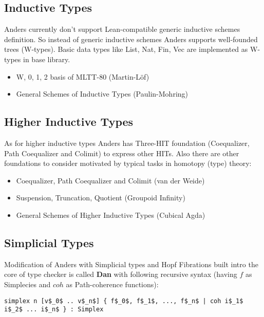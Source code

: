 \documentclass{article}
\theoremstyle{definition}
\begin{document}
\newpage
\subsection{Inductive Types}

Anders currently don’t support Lean-compatible generic inductive schemes
definition. So instead of generic inductive schemes Anders supports well-founded trees (W-types).
Basic data types like List, Nat, Fin, Vec are implemented as W-types in base library.

\begin{itemize}
\item W, 0, 1, 2 basis of MLTT-80 (Martin-L\"{o}f)
\item General Schemes of Inductive Types (Paulin-Mohring)
\end{itemize}

\subsection{Higher Inductive Types}

As for higher inductive types Anders has Three-HIT foundation (Coequalizer, Path Coequalizer and Colimit)
to express other HITs. Also there are other foundations to consider motivated by typical tasks in homotopy (type) theory:

\begin{itemize}
\item Coequalizer, Path Coequalizer and Colimit (van der Weide)
\item Suspension, Truncation, Quotient (Groupoid Infinity)
\item General Schemes of Higher Inductive Types (Cubical Agda)
\end{itemize}

\subsection{Simplicial Types}

Modification of Anders with Simplicial types and Hopf Fibrations built intro the core of type checker
is called \textbf{Dan} with following recursive syntax (having $f$ as Simplecies and $coh$ as Path-coherence functions):

\begin{lstlisting}[mathescape=true]
simplex n [v$_0$ .. v$_n$] { f$_0$, f$_1$, ..., f$_n$ | coh i$_1$ i$_2$ ... i$_n$ } : Simplex
\end{lstlisting}
\end{document}
